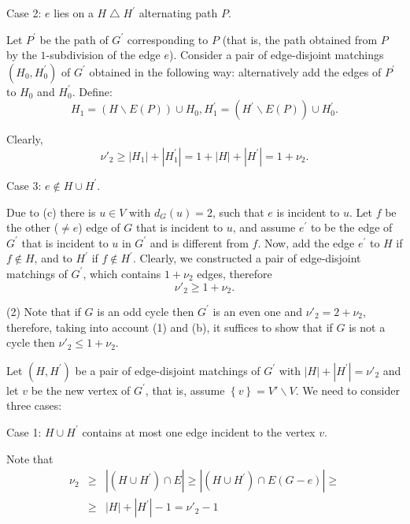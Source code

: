 \documentclass[fleqn,12pt,twoside]{article}
\newenvironment{proof}[1][Proof.]{\begin{trivlist}
\item[\hskip \labelsep {\bfseries #1}]}{\end{trivlist}}
\begin{document}
\begin{proof}
Case 2: $e$ lies on a $H\bigtriangleup H^{\prime }$ alternating path
$P$.

Let $P^{\prime }$ be the path of $G^{\prime }$ corresponding to $P$
(that is, the path obtained from $P$ by the $1$-subdivision of the
edge $e$).
Consider a pair of edge-disjoint matchings $(H_{0},H_{0}^{\prime })$ of $G^{\prime }$ obtained in the following way: alternatively add the edges of $P^{\prime }$ to $H_{0}$ and $H_{0}^{\prime }$. Define:\begin{equation*}
H_{1}=(H\backslash E(P))\cup H_{0},H_{1}^{\prime }=(H^{\prime
}\backslash E(P))\cup H_{0}^{\prime }.
\end{equation*}

Clearly,
\begin{equation*}
\nu' _{2}\geq \left\vert H_{1}\right\vert +\left\vert H_{1}^{\prime
}\right\vert =1+\left\vert H\right\vert +\left\vert H^{\prime
}\right\vert =1+\nu _{2}.
\end{equation*}

Case 3: $e\notin H\cup H^{\prime }$.

Due to (c) there is $u\in V$ with $d_{G}(u)=2$, such that $e$ is
incident to $u$. Let $f$ be the other ($\neq e$) edge of $G$ that is
incident to $u$, and assume $e^{\prime }$ to be the edge of
$G^{\prime }$ that is incident to $u$ in $G^{\prime }$ and is
different from $f$. Now, add the edge $e^{\prime }$ to $H$ if
$f\notin H$, and to $H^{\prime }$ if $f\notin H^{\prime }$. Clearly,
we constructed a pair of edge-disjoint matchings of $G^{\prime }$,
which contains $1+\nu _{2}$ edges, therefore\begin{equation*}
\nu' _{2}\geq 1+\nu _{2}.
\end{equation*}

(2) Note that if $G$ is an odd cycle then $G^{\prime }$ is an even one and $\nu' _{2}=2+\nu _{2}$, therefore, taking into account (1) and (b),
it suffices to show that if $G$ is not a cycle then $\nu' _{2}\leq
1+\nu _{2}$.

Let $(H,H^{\prime })$ be a pair of edge-disjoint matchings of
$G^{\prime }$ with $\left\vert H\right\vert +\left\vert H^{\prime
}\right\vert =\nu' _{2}$ and let $v$ be the new vertex of $G^{\prime
}$, that is, assume $\left\{ v\right\} =V'\backslash V$. We need to
consider three cases:

Case 1: $H\cup H^{\prime }$ contains at most one edge incident to
the vertex $v$.

Note that\begin{eqnarray*}
\nu _{2} &\geq &\left\vert (H\cup H^{\prime })\cap E\right\vert \geq
\left\vert (H\cup H^{\prime })\cap E(G-e)\right\vert \geq \\
&\geq &\left\vert H\right\vert +\left\vert H^{\prime }\right\vert
-1=\nu' _{2}-1
\end{eqnarray*}


\end{proof}
\end{document}
